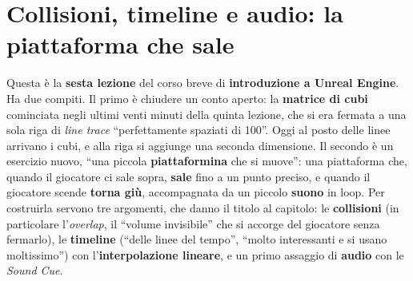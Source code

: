 %
%
%
%    
%

\chapter[Collisioni, timeline e audio]{Collisioni, timeline e audio: la piattaforma che sale}
\label{ue6:cap:piattaforma}

Questa è la \textbf{sesta lezione} del corso breve di \textbf{introduzione a Unreal
Engine}. Ha due compiti. Il primo è chiudere un conto aperto: la \textbf{matrice di
cubi} cominciata negli ultimi venti minuti della quinta lezione, che si era fermata a una
sola riga di \emph{line trace} ``perfettamente spaziati di 100''. Oggi al posto delle
linee arrivano i cubi, e alla riga si aggiunge una seconda dimensione. Il secondo è un
esercizio nuovo, ``una piccola \textbf{piattaformina} che si muove'': una piattaforma
che, quando il giocatore ci sale sopra, \textbf{sale} fino a un punto preciso, e quando
il giocatore scende \textbf{torna giù}, accompagnata da un piccolo \textbf{suono} in
loop. Per costruirla servono tre argomenti, che danno il titolo al capitolo: le
\textbf{collisioni} (in particolare l'\emph{overlap}, il ``volume invisibile'' che si
accorge del giocatore senza fermarlo), le \textbf{timeline} (``delle linee del tempo'',
``molto interessanti e si usano moltissimo'') con l'\textbf{interpolazione lineare}, e
un primo assaggio di \textbf{audio} con le \emph{Sound Cue}.

